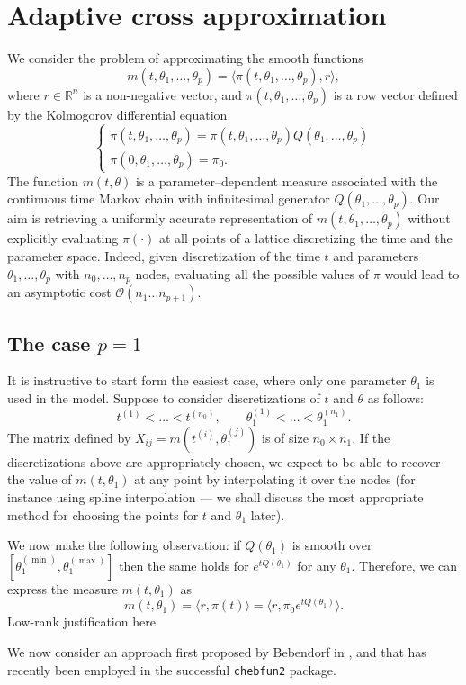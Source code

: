 \documentclass[]{article}
\begin{document}
\section{Adaptive cross approximation}

We consider the problem of approximating the smooth functions 
\[
    m(t, \theta_1, \ldots, \theta_p) = 
      \langle 
        \pi(t, \theta_1, \ldots, \theta_p), 
        r
       \rangle,
\]
where $r \in \mathbb R^n$ is a non-negative vector, 
and $\pi(t, \theta_1, \ldots, \theta_p)$ is
a row vector defined by 
the Kolmogorov differential equation
\[
    \begin{cases}
        \dot{\pi}(t, \theta_1, \ldots, \theta_p) = \pi(t, \theta_1, \ldots, \theta_p) Q(\theta_1, \ldots, \theta_p) \\ 
        \pi(0, \theta_1, \ldots, \theta_p) = \pi_0. 
    \end{cases}
\]
The function 
$m(t, \theta)$ is a parameter--dependent measure associated with
the continuous time
Markov chain with infinitesimal generator 
$Q(\theta_1, \ldots, \theta_p)$. Our aim is 
retrieving a uniformly accurate representation of 
$m(t, \theta_1, \ldots, \theta_p)$ without explicitly 
evaluating $\pi(\cdot)$ at all points 
of a lattice discretizing the time and the parameter space. 
Indeed, given discretization of the time $t$ and parameters 
$\theta_1, \ldots, \theta_p$ with $n_0, \ldots, n_p$ 
nodes, evaluating all the possible 
values of $\pi$ would lead to an asymptotic cost 
$\mathcal O(n_1 \ldots n_{p+1})$. 

\subsection{The case $p = 1$}

It is instructive to start form the easiest case, where only 
one parameter $\theta_1$ is used in the model. Suppose to 
consider discretizations of $t$ and $\theta$ 
as follows:
\[
    t^{(1)} < \ldots < t^{(n_0)}, \qquad 
    \theta_1^{(1)} < \ldots < \theta_1^{(n_1)}. 
\]
The matrix defined by $X_{ij} = m(t^{(i)}, \theta_1^{(j)})$ is of 
size $n_0 \times n_1$. If the discretizations above are 
appropriately chosen, we expect to be able to recover the 
value of $m(t, \theta_1)$ at any point by interpolating it 
over the nodes (for instance using spline interpolation --- we shall 
discuss the most appropriate method for choosing the points for 
$t$ and $\theta_1$ later). 

We now make the following observation: if 
$Q(\theta_1)$ is smooth over $[\theta_1^{(\min)}, \theta_1^{(\max)}]$
then the same holds for $e^{tQ(\theta_1)}$ for any 
$\theta_1$. Therefore, we can express the measure 
$m(t, \theta_1)$ as 
\[
    m(t, \theta_1) = \langle r, \pi(t) \rangle = 
      \langle r, \pi_0 e^{tQ(\theta_1)} \rangle. 
\]
{ \color{red} Low-rank justification here }

We now consider an approach first proposed by Bebendorf 
in \cite{bebendorf}, and that has recently been employed in 
the successful \texttt{chebfun2} package. 
\end{document}
